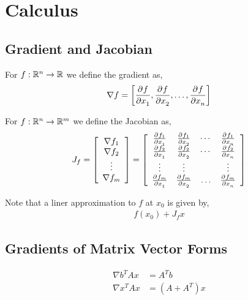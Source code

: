 \documentclass[12pt]{article}
\begin{document}
\maketitle

\pagebreak
\tableofcontents


\pagebreak
\section{Calculus}

\subsection{Gradient and Jacobian}
For \( f:\mathbb{R}^n\to\mathbb{R} \) we define the gradient as,
\begin{align*}
    \nabla f = \left[ \frac{\partial^{}f}{\partial x_1^{}}, \frac{\partial^{}f}{\partial x_2^{}}, \ldots, \frac{\partial^{}f}{\partial x_n^{}} \right]
\end{align*}

For \( f:\mathbb{R}^n\to\mathbb{R}^m \) we define the Jacobian as,
\begin{align*}
    J_f = \left[\begin{array}{c}
        \nabla f_1 \\ \nabla f_2 \\ \vdots \\ \nabla f_m
    \end{array}\right]
    =
    \left[\begin{array}{cccc}
        \frac{\partial^{}f_1}{\partial x_1^{}} & \frac{\partial^{}f_1}{\partial x_2^{}} & \cdots &\frac{\partial^{}f_1}{\partial x_n^{}} \\
        \frac{\partial^{}f_2}{\partial x_1^{}} & \frac{\partial^{}f_2}{\partial x_2^{}} & \cdots &\frac{\partial^{}f_2}{\partial x_n^{}} \\
        \vdots & \vdots & & \vdots\\
         \frac{\partial^{}f_m}{\partial x_1^{}} & \frac{\partial^{}f_m}{\partial x_2^{}} &\ldots & \frac{\partial^{}f_m}{\partial x_n^{}}
    \end{array}\right]
\end{align*}

Note that a liner approximation to \( f \) at \( x_0 \) is given by,
\begin{align*}
    f(x_0) + J_f x
\end{align*}


\subsection{Gradients of Matrix Vector Forms}
\begin{align*}
    \nabla b^TAx &= A^Tb \\
    \nabla x^TAx &= (A+A^T)x
\end{align*}
\end{document}
